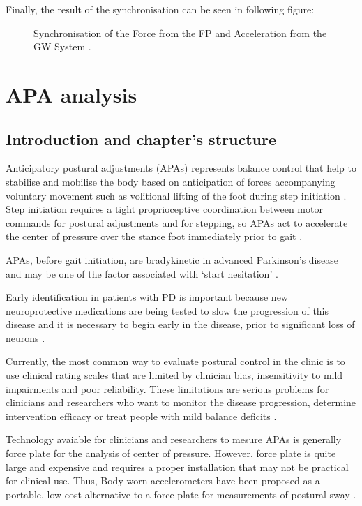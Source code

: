 Finally, the result of the synchronisation can be seen in following figure:

\begin{figure}[H]
	\centering
	\caption{Synchronisation of the Force from the FP and Acceleration from the GW System .}
	\label{fig:sinchronisedSignals}
\end{figure}


\section{APA analysis}
\subsection{Introduction and chapter's structure}

Anticipatory postural adjustments (APAs)  represents balance control that help to stabilise and mobilise the body based on anticipation of forces accompanying voluntary movement such as volitional lifting of the foot during step initiation \cite{Mancini2010}. Step initiation requires a tight proprioceptive coordination between motor commands for postural adjustments and for stepping, so APAs act to accelerate the center of pressure over the stance foot immediately prior to gait \cite{Mancini2009}.

APAs, before gait initiation, are bradykinetic in advanced Parkinson’s disease and may be one of the factor associated with ‘start hesitation’ \cite{Mancini2009}.

Early identification in patients with PD is important because new neuroprotective medications are being tested to slow the progression of this disease and it is necessary to begin early in the disease, prior to significant loss of neurons \cite{Mancini2012}. 

Currently, the most common way to evaluate postural control in the clinic is to use clinical rating scales that are limited by clinician bias, insensitivity to mild impairments and poor reliability. These limitations are serious problems for clinicians and researchers who want to monitor the disease progression, determine intervention efficacy or treat people with mild balance deficits \cite{Mancini2012} .

Technology avaiable for clinicians and researchers to mesure APAs is generally force plate for the analysis of center of pressure. However, force plate is quite large and expensive and requires a proper installation that may not be practical for clinical use. Thus, Body-worn accelerometers have been proposed as a portable, low-cost alternative to a force plate for measurements of postural sway \cite{Mancini2012} .
 
